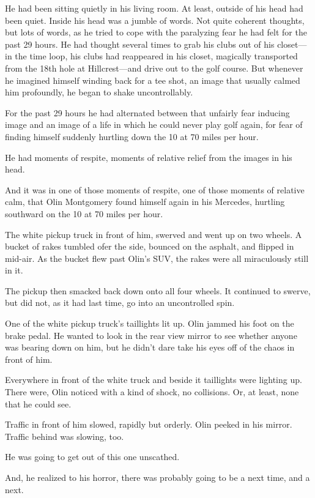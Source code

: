  He had been sitting quietly in his living room. At least, outside of his head had been quiet. Inside his head was a jumble of words. Not quite coherent thoughts, but lots of words, as he tried to cope with the paralyzing fear he had felt for the past 29 hours. He had thought several times to grab his clubs out of his closet—in the time loop, his clubs had reappeared in his closet, magically transported from the 18th hole at Hillcrest—and drive out to the golf course. But whenever he imagined himself winding back for a tee shot, an image that usually calmed him profoundly, he began to shake uncontrollably.

For the past 29 hours he had alternated between that unfairly fear inducing image and an image of a life in which he could never play golf again, for fear of finding himself suddenly hurtling down the 10 at 70 miles per hour.

He had moments of respite, moments of relative relief from the images in his head.

And it was in one of those moments of respite, one of those moments of relative calm, that Olin Montgomery found himself again in his Mercedes, hurtling southward on the 10 at 70 miles per hour.

The white pickup truck in front of him, swerved and went up on two wheels. A bucket of rakes tumbled ofer the side, bounced on the asphalt, and flipped in mid-air. As the bucket flew past Olin’s SUV, the rakes were all miraculously still in it.

The pickup then smacked back down onto all four wheels. It continued to swerve, but did not, as it had last time, go into an uncontrolled spin.

One of the white pickup truck’s taillights lit up. Olin jammed his foot on the brake pedal. He wanted to look in the rear view mirror to see whether anyone was bearing down on him, but he didn’t dare take his eyes off of the chaos in front of him.

Everywhere in front of the white truck and beside it taillights were lighting up. There were, Olin noticed with a kind of shock, no collisions. Or, at least, none that he could see.

Traffic in front of him slowed, rapidly but orderly. Olin peeked in his mirror. Traffic behind was slowing, too.

He was going to get out of this one unscathed.

And, he realized to his horror, there was probably going to be a next time, and a next.

